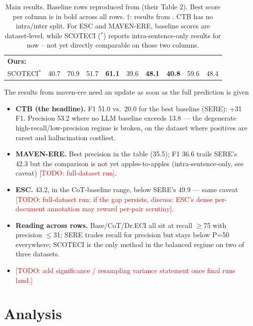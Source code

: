 \documentclass[11pt]{article}
\newcommand{\todo}[1]{\textcolor{red}{[TODO: #1]}}
\newcommand{\method}{SCOTECI}
\begin{document}
\begin{table}
\begin{tabular}{l ccc|ccc|ccc}
\midrule
\textbf{Ours:} & & & & & & & & & \\
\quad SCOTECI$^*$   & 40.7 & 70.9 & 51.7 & \textbf{61.1} & 39.6 & \textbf{48.1} & \textbf{40.8} & 59.6 & 48.4 \\
\bottomrule
\end{tabular}
\centering
\small
\caption{Main results. Baseline rows reproduced from \citet{hao2026sere} (their Table 2). Best score per column is in bold across all rows. $\dagger$: results from \citet{cai2025dreci}. CTB has no intra/inter split. For ESC and MAVEN-ERE, baseline scores are dataset-level, while SCOTECI ($^*$) reports intra-sentence-only results for now -- not yet directly comparable on those two columns.}
\label{tab:main-results}
\end{table}
The results from maven-ere need an update as soon as the full prediction is given
\begin{itemize}
  \item \textbf{CTB (the headline).} F1 51.0 vs.\ 20.0 for the best baseline
        (SERE): +31 F1. Precision 53.2 where no LLM baseline exceeds 13.8 ---
        the degenerate high-recall/low-precision regime is broken, on the
        dataset where positives are rarest and hallucination costliest.
  \item \textbf{MAVEN-ERE.} Best precision in the table (35.5); F1 36.6 trails
        SERE's 42.3 but the comparison is not yet apples-to-apples
        (intra-sentence-only, see caveat) \todo{full-dataset run}.
  \item \textbf{ESC.} 43.2, in the CoT-baseline range, below SERE's 49.9 ---
        same caveat \todo{full-dataset run; if the gap persists, discuss:
        ESC's dense per-document annotation may reward per-pair scrutiny}.
  \item \textbf{Reading across rows.} Base/CoT/Dr.ECI all sit at recall
        $\ge$75 with precision $\le$31; SERE trades recall for precision but
        stays below P=50 everywhere; \method{} is the only method in the
        balanced regime on two of three datasets.
  \item \todo{add significance / resampling variance statement once final runs
        land.}
\end{itemize}

\section{Analysis}
\label{sec:analysis}
\end{document}

